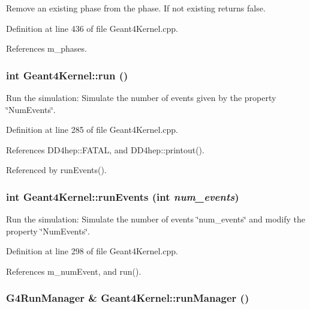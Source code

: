 Remove an existing phase from the phase. If not existing returns false. 

Definition at line 436 of file Geant4Kernel.cpp.

References m\_\-phases.\hypertarget{class_d_d4hep_1_1_simulation_1_1_geant4_kernel_ad04026c76cad51506b859ccefffffba8}{
\subsubsection[{run}]{\setlength{\rightskip}{0pt plus 5cm}int Geant4Kernel::run ()}}
\label{class_d_d4hep_1_1_simulation_1_1_geant4_kernel_ad04026c76cad51506b859ccefffffba8}


Run the simulation: Simulate the number of events given by the property \char`\"{}NumEvents\char`\"{}. 

Definition at line 285 of file Geant4Kernel.cpp.

References DD4hep::FATAL, and DD4hep::printout().

Referenced by runEvents().\hypertarget{class_d_d4hep_1_1_simulation_1_1_geant4_kernel_a0ce3dec62c67dbaf72748238983bb898}{
\subsubsection[{runEvents}]{\setlength{\rightskip}{0pt plus 5cm}int Geant4Kernel::runEvents (int {\em num\_\-events})}}
\label{class_d_d4hep_1_1_simulation_1_1_geant4_kernel_a0ce3dec62c67dbaf72748238983bb898}


Run the simulation: Simulate the number of events \char`\"{}num\_\-events\char`\"{} and modify the property \char`\"{}NumEvents\char`\"{}. 

Definition at line 298 of file Geant4Kernel.cpp.

References m\_\-numEvent, and run().\hypertarget{class_d_d4hep_1_1_simulation_1_1_geant4_kernel_aa01093467efb9b3a4f9179ba22ac7899}{
\subsubsection[{runManager}]{\setlength{\rightskip}{0pt plus 5cm}G4RunManager \& Geant4Kernel::runManager ()}}
\label{class_d_d4hep_1_1_simulation_1_1_geant4_kernel_aa01093467efb9b3a4f9179ba22ac7899}


